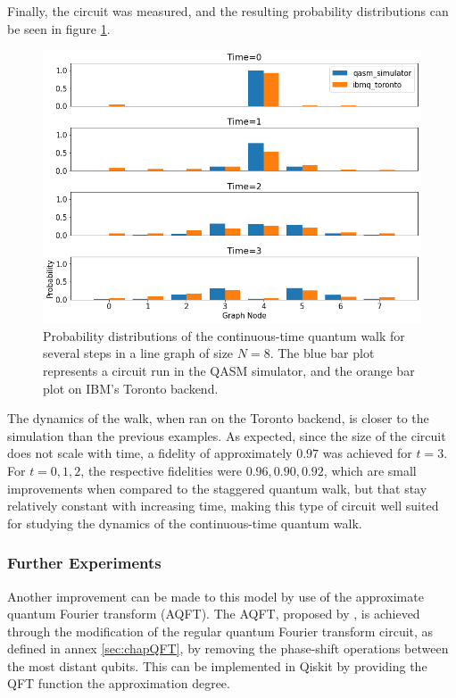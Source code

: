 \documentclass[../../dissertation.tex]{subfiles}
\begin{document}
Finally, the circuit was measured, and the resulting probability distributions
can be seen in figure \ref{fig:contQWQiskitDist}.
\begin{figure}[!h]
	\centering
	\includegraphics[scale=0.4]{img/Qiskit/ContQuantumWalk/ContQW_N3_S0123.png}
	\caption{Probability distributions of the continuous-time quantum walk for several steps in a line graph of size $N=8$. The blue bar plot represents a circuit run in the QASM simulator, and the orange bar plot on IBM's Toronto backend.} 
	\label{fig:contQWQiskitDist}
\end{figure}
The dynamics of the walk, when ran on the Toronto backend, is closer to the
simulation than the previous examples. As expected, since the size of the
circuit does not scale with time, a fidelity of approximately $0.97$ was
achieved for $t=3$. For $t=0,1,2$, the respective fidelities were $0.96, 0.90,
0.92$, which are small improvements when compared to the staggered quantum
walk, but that stay relatively constant with increasing time, making this type
of circuit well suited for studying the dynamics of the continuous-time quantum
walk.

\subsubsection{Further Experiments}
Another improvement can be made to this model by use of the approximate quantum
Fourier transform (AQFT). The AQFT, proposed by \cite{Coppersmith94}, is
achieved through the modification of the regular quantum Fourier transform
circuit, as defined in annex \ref{sec:chapQFT}, by removing the phase-shift
operations between the most distant qubits. This can be implemented in Qiskit
by providing the QFT function the approximation degree.\par
\end{document}
